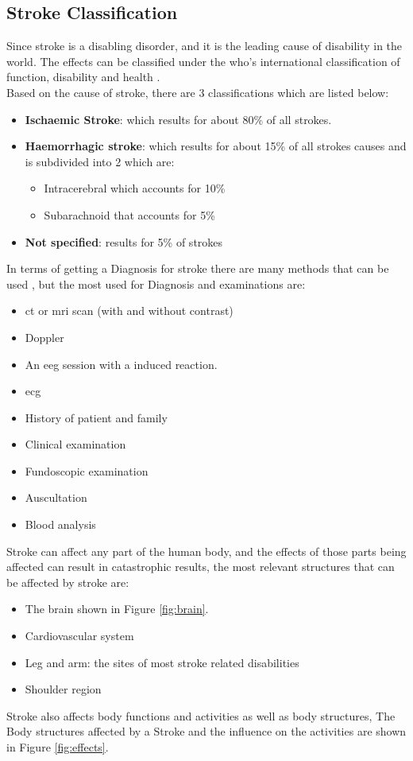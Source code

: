 \subsection{Stroke Classification}
Since stroke is a disabling disorder, and it is the leading cause of disability in the world. The effects can be classified under the \ac{who}'s international classification of function, disability and health \cite{Stucki2005}.\\
\cite{mayosym} Based on the cause of stroke, there are 3 classifications which are listed below:
\begin{itemize}%
	\item \textbf{Ischaemic Stroke}: which results for about 80\% of all strokes.
	\item \textbf{Haemorrhagic stroke}: which results for about 15\% of all strokes causes and is subdivided into 2 which are:
	\begin{itemize}
		\item Intracerebral which accounts for 10\%
		\item Subarachnoid that accounts for 5\%
	\end{itemize}
	\item \textbf{Not specified}: results for 5\% of strokes
\end{itemize}
In terms of getting a Diagnosis for stroke there are many methods that can be used \cite{mayodiag}, but the most used for Diagnosis and examinations are:
\begin{itemize}%
	\item \ac{ct} or \ac{mri} scan (with and without contrast)
	\item Doppler
	\item An \ac{eeg} session with a induced reaction.
	\item \ac{ecg}
	\item History of patient and family
	\item Clinical examination
	\item Fundoscopic examination
	\item Auscultation
	\item Blood analysis
\end{itemize}
Stroke can affect any part of the human body, and the effects of those parts being affected can result in catastrophic results, the most relevant structures that can be affected by stroke are:
\begin{itemize}%
	\item The brain shown in Figure \ref{fig:brain}.
	\item Cardiovascular system
	\item Leg and arm: the sites of most stroke related disabilities
	\item Shoulder region
\end{itemize}
Stroke also affects body functions and activities as well as body structures, The Body structures affected by a Stroke and the influence on the activities are shown in Figure \ref{fig:effects}.

